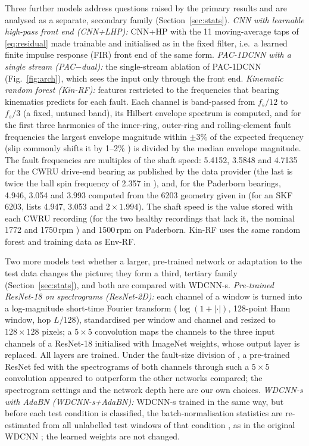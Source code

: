 \documentclass[conference]{IEEEtran}
\begin{document}
Three further models address questions raised by the primary results and are analysed as a separate, secondary family (Section~\ref{sec:stats}). \emph{CNN with learnable high-pass front end (CNN+LHP):} CNN+HP with the 11 moving-average taps of \eqref{eq:residual} made trainable and initialised as in the fixed filter, i.e.\ a learned finite impulse response (FIR) front end of the same form. \emph{PAC-1DCNN with a single stream (PAC$-$dual):} the single-stream ablation of PAC-1DCNN (Fig.~\ref{fig:arch}), which sees the input only through the front end. \emph{Kinematic random forest (Kin-RF):} features restricted to the frequencies that bearing kinematics predicts for each fault. Each channel is band-passed from $f_s/12$ to $f_s/3$ (a fixed, untuned band), its Hilbert envelope spectrum is computed, and for the first three harmonics of the inner-ring, outer-ring and rolling-element fault frequencies the largest envelope magnitude within $\pm3\%$ of the expected frequency (slip commonly shifts it by 1--2\% \cite{smith2015cwru}) is divided by the median envelope magnitude. The fault frequencies are multiples of the shaft speed: 5.4152, 3.5848 and 4.7135 for the CWRU drive-end bearing as published by the data provider \cite{cwrudata} (the last is twice the ball spin frequency of 2.357 in \cite[Table~2]{smith2015cwru}), and, for the Paderborn bearings, 4.946, 3.054 and 3.993 computed from the 6203 geometry given in \cite[Table~1]{lessmeier2016kat} (for an SKF 6203, \cite[Table~2]{smith2015cwru} lists 4.947, 3.053 and $2\times1.994$). The shaft speed is the value stored with each CWRU recording (for the two healthy recordings that lack it, the nominal 1772 and 1750\,rpm \cite[Table~A1]{smith2015cwru}) and 1500\,rpm on Paderborn. Kin-RF uses the same random forest and training data as Env-RF.

Two more models test whether a larger, pre-trained network or adaptation to the test data changes the picture; they form a third, tertiary family (Section~\ref{sec:stats}), and both are compared with WDCNN-s. \emph{Pre-trained ResNet-18 on spectrograms (ResNet-2D):} each channel of a window is turned into a log-magnitude short-time Fourier transform ($\log(1+|\cdot|)$, 128-point Hann window, hop $L/128$), standardised per window and channel and resized to $128\times128$ pixels; a $5\times5$ convolution maps the channels to the three input channels of a ResNet-18 \cite{he2016resnet} initialised with ImageNet weights, whose output layer is replaced. All layers are trained. Under the fault-size division of \cite{hendriks2022cwru}, a pre-trained ResNet fed with the spectrograms of both channels through such a $5\times5$ convolution appeared to outperform the other networks compared; the spectrogram settings and the network depth here are our own choices. \emph{WDCNN-s with AdaBN (WDCNN-s+AdaBN):} WDCNN-s trained in the same way, but before each test condition is classified, the batch-normalisation statistics are re-estimated from all unlabelled test windows of that condition \cite{li2018adabn}, as in the original WDCNN \cite{zhang2017wdcnn}; the learned weights are not changed.
\end{document}
